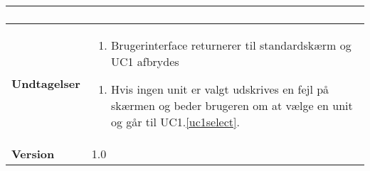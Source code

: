 \begin{table}[H]
\begin{tabular} {|p{6cm}|p{8cm}|}
\begin{enumerate}
			\end{enumerate}\\\hline
		
		\textbf{Undtagelser}					
		&\begin{enumerate}[label= \ref{uc1ex1}a.]
			\item Brugerinterface returnerer til standardskærm og UC1 afbrydes
		\end{enumerate}
											
		\begin{enumerate}[label= \ref{uc1ex2}a.]
			\item Hvis ingen unit er valgt udskrives en fejl på skærmen og beder brugeren om at vælge en unit og går til UC1.\ref{uc1select}.
		\end{enumerate} \\\hline
											
		\textbf{Version}		&1.0 \\\hline

	\end{tabular}
	\label{UC1} 
\end{table}